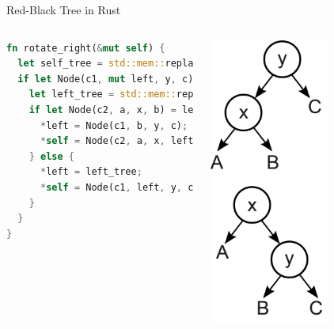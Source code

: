 \begin{frame}[fragile]{Red-Black Tree in Rust}
\begin{columns}
\begin{lstlisting}[language=Rust, caption={Tree rotation without allocation}, basicstyle=\footnotesize\ttfamily]
fn rotate_right(&mut self) {
  let self_tree = std::mem::replace(self, Empty);
  if let Node(c1, mut left, y, c) = self_tree {
    let left_tree = std::mem::replace(&mut *left, Empty);
    if let Node(c2, a, x, b) = left_tree {
      *left = Node(c1, b, y, c);
      *self = Node(c2, a, x, left);
    } else {
      *left = left_tree;
      *self = Node(c1, left, y, c);
    }
  }
}
\end{lstlisting}
\centering
\includegraphics[width=0.6\textwidth]{img/rotate_right.png}
\end{columns}
\end{frame}


